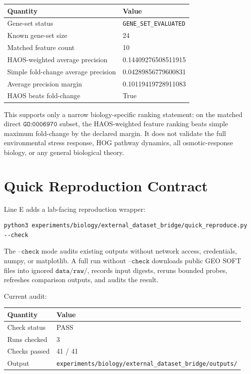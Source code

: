 \documentclass[11pt]{article}
\begin{document}
\begin{center}
\begin{tabular}{ll}
\toprule
Quantity & Value \\
\midrule
Gene-set status & \texttt{GENE\_SET\_EVALUATED} \\
Known gene-set size & 24 \\
Matched feature count & 10 \\
HAOS-weighted average precision & 0.14409276508511915 \\
Simple fold-change average precision & 0.04289856779600831 \\
Average precision margin & 0.10119419728911083 \\
HAOS beats fold-change & True \\
\bottomrule
\end{tabular}
\end{center}

This supports only a narrow biology-specific ranking statement: on the matched direct \(\texttt{GO:0006970}\) subset, the HAOS-weighted feature ranking beats simple maximum fold-change by the declared margin. It does not validate the full environmental stress response, HOG pathway dynamics, all osmotic-response biology, or any general biological theory.

\section{Quick Reproduction Contract}

Line E adds a lab-facing reproduction wrapper:

\begin{verbatim}
python3 experiments/biology/external_dataset_bridge/quick_reproduce.py --check
\end{verbatim}

The \(\texttt{--check}\) mode audits existing outputs without network access, credentials, numpy, or matplotlib. A full run without \(\texttt{--check}\) downloads public GEO SOFT files into ignored \(\texttt{data/raw/}\), records input digests, reruns bounded probes, refreshes comparison outputs, and audits the result.

Current audit:

\begin{center}
\begin{tabular}{ll}
\toprule
Quantity & Value \\
\midrule
Check status & PASS \\
Runs checked & 3 \\
Checks passed & 41 / 41 \\
Output & \texttt{experiments/biology/external\_dataset\_bridge/outputs/} \\
\bottomrule
\end{tabular}
\end{center}
\end{document}

